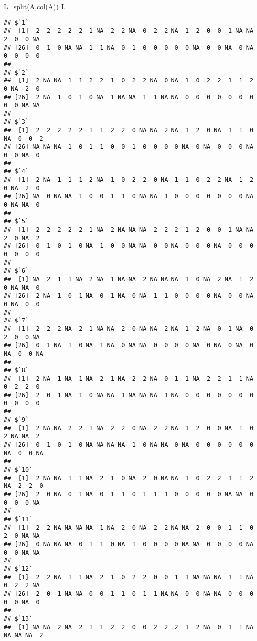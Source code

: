 \documentclass[
]{article}
\newenvironment{Shaded}{\begin{snugshade}}{\end{snugshade}}
\newcommand{\FunctionTok}[1]{\textcolor[rgb]{0.00,0.00,0.00}{#1}}
\newcommand{\NormalTok}[1]{#1}
\newcommand{\OtherTok}[1]{\textcolor[rgb]{0.56,0.35,0.01}{#1}}
\begin{document}
\begin{Shaded}
\begin{Highlighting}[]
\NormalTok{L}\OtherTok{=}\FunctionTok{split}\NormalTok{(A,}\FunctionTok{col}\NormalTok{(A))}
\NormalTok{L}
\end{Highlighting}
\end{Shaded}

\begin{verbatim}
## $`1`
##  [1]  2  2  2  2  2  1 NA  2  2 NA  0  2  2 NA  1  2  0  0  1 NA NA  2  0  0 NA
## [26]  0  1  0 NA NA  1  1 NA  0  1  0  0  0  0  0 NA  0  0 NA  0 NA  0  0  0  0
## 
## $`2`
##  [1]  2 NA NA  1  1  2  2  1  0  2  2 NA  0 NA  1  0  2  2  1  1  2  0 NA  2  0
## [26]  2 NA  1  0  1  0 NA  1 NA NA  1  1 NA NA  0  0  0  0  0  0  0  0  0 NA NA
## 
## $`3`
##  [1]  2  2  2  2  2  1  1  2  2  0 NA NA  2 NA  1  2  0 NA  1  1  0 NA  0  0  2
## [26] NA NA NA  1  0  1  1  0  0  1  0  0  0  0 NA  0 NA  0  0  0 NA  0  0 NA  0
## 
## $`4`
##  [1]  2 NA  1  1  1  2 NA  1  0  2  2  0 NA  1  1  0  2  2 NA  1  2  0 NA  2  0
## [26] NA  0 NA NA  1  0  0  1  1  0 NA NA  1  0  0  0  0  0  0  0 NA  0 NA NA  0
## 
## $`5`
##  [1]  2  2  2  2  2  1 NA  2 NA NA NA  2  2  2  1  2  0  0  1 NA NA  2  0 NA  2
## [26]  0  1  0  1  0 NA  1  0  0 NA NA  0  0 NA  0  0  0 NA  0  0  0  0  0  0  0
## 
## $`6`
##  [1] NA  2  1  1 NA  2 NA  1 NA NA  2 NA NA NA  1  0 NA  2 NA  1  2  0 NA NA  0
## [26]  2 NA  1  0  1 NA  0  1 NA  0 NA  1  1  0  0  0  0 NA  0  0 NA  0 NA  0  0
## 
## $`7`
##  [1]  2  2  2 NA  2  1 NA NA  2  0 NA NA  2 NA  1  2 NA  0  1 NA  0  2  0  0 NA
## [26]  0  1 NA  1  0 NA  1 NA  0 NA NA  0  0  0  0 NA  0 NA  0 NA  0 NA  0  0 NA
## 
## $`8`
##  [1]  2 NA  1 NA  1 NA  2  1 NA  2  2 NA  0  1  1 NA  2  2  1  1 NA  0  2  2  0
## [26]  2  0  1 NA  1  0 NA NA  1 NA NA NA  1 NA  0  0  0  0  0  0  0  0  0  0  0
## 
## $`9`
##  [1]  2 NA NA  2  2  1 NA  2  2  0 NA  2  2 NA  1  2  0  0 NA  1  0  2 NA NA  2
## [26]  0  1  0  1  0 NA NA NA NA  1  0 NA NA  0 NA  0  0  0  0  0  0 NA  0  0 NA
## 
## $`10`
##  [1]  2 NA NA  1  1 NA  2  1  0 NA  2  0 NA NA  1  0  2  2  1  1  2 NA  2  2  0
## [26]  2  0 NA  0  1 NA  0  1  1  0  1  1  1  0  0  0  0  0 NA NA  0  0  0  0 NA
## 
## $`11`
##  [1]  2  2 NA NA NA NA  1 NA  2  0 NA  2  2 NA NA  2  0  0  1  1  0  2  0 NA NA
## [26]  0 NA NA NA  0  1  1  0 NA  1  0  0  0  0 NA NA  0  0  0  0 NA  0  0 NA NA
## 
## $`12`
##  [1]  2  2 NA  1  1 NA  2  1  0  2  2  0  0  1  1 NA NA NA  1  1 NA  0  2  2 NA
## [26]  2  0  1 NA NA  0  0  1  1  0  1  1 NA NA  0  0 NA NA  0  0  0  0  0 NA  0
## 
## $`13`
##  [1] NA NA  2 NA  2  1  1  2  2  0  0  2  2  2  1  2 NA  0  1  1 NA NA NA NA  2

\end{verbatim}
\end{document}
